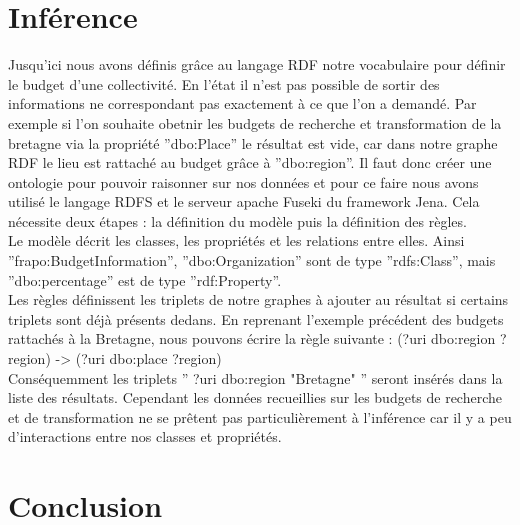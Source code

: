 \documentclass[a4paper,sffamily,12pt]{article}
\begin{document}
			\vspace{0.5cm}			

	\section{Inférence}

		\vspace{0.5cm}
		
		Jusqu'ici nous avons définis grâce au langage RDF notre vocabulaire pour définir le budget d'une collectivité. En l'état il n'est pas possible de sortir des informations ne correspondant pas exactement à ce que l'on a demandé. Par exemple si l'on souhaite obetnir les budgets de recherche et transformation de la bretagne via la propriété ''dbo:Place'' le résultat est vide, car dans notre graphe RDF le lieu est rattaché au budget grâce à ''dbo:region''. Il faut donc créer une ontologie pour pouvoir raisonner sur nos données et pour ce faire nous avons utilisé le langage RDFS et le serveur apache Fuseki du framework Jena. Cela nécessite deux étapes : la définition du modèle puis la définition des règles.\\
		
		\indent Le modèle décrit les classes, les propriétés et les relations entre elles. Ainsi ''frapo:BudgetInformation'', ''dbo:Organization'' sont de type ''rdfs:Class'', mais ''dbo:percentage'' est de type ''rdf:Property''. \\ 
		
		\indent Les règles définissent les triplets de notre graphes à ajouter au résultat si certains triplets sont déjà présents dedans. En reprenant l'exemple précédent des budgets rattachés à la Bretagne, nous pouvons écrire la règle suivante : (?uri dbo:region ?region) -> (?uri dbo:place ?region) \\ 
		
		\indent Conséquemment les triplets '' ?uri dbo:region "Bretagne" '' seront insérés dans la liste des résultats. Cependant les données recueillies sur les budgets de recherche et de transformation ne se prêtent pas particulièrement à l'inférence car il y a peu d'interactions entre nos classes et propriétés.

		\newpage
				
	\section{Conclusion}

		\vspace{0.5cm}			
\end{document}
